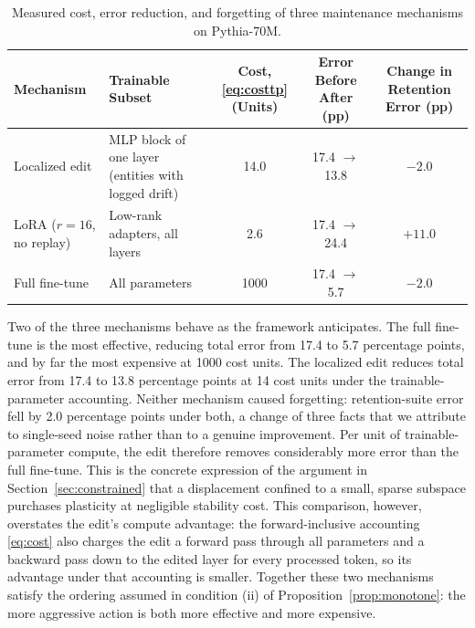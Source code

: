 \documentclass[electronics,article,submit,pdftex,moreauthors]{Definitions/mdpi}
\begin{document}
\begin{table}[H]
\caption{Measured cost, error reduction, and forgetting of three maintenance mechanisms on Pythia-70M.\label{tab:mechanisms}}
\small
\begin{tabularx}{\textwidth}{LLCCC}
\toprule
\textbf{Mechanism} & \textbf{Trainable Subset} & \textbf{Cost, \eqref{eq:costtp} (Units)} & \textbf{Error Before} \boldmath{$\to$} \textbf{After (pp)} & \textbf{Change in Retention Error (pp)}\\
\midrule
Localized edit & MLP block of one layer (entities with logged drift) & 14.0 & 17.4 $\to$ 13.8 & $-2.0$\\
LoRA ($r=16$, no replay) & Low-rank adapters, all layers & 2.6 & 17.4 $\to$ 24.4 & $+11.0$\\
Full fine-tune & All parameters & 1000 & 17.4 $\to$ 5.7 & $-2.0$\\
\bottomrule
\end{tabularx}
\end{table}

Two of the three mechanisms behave as the framework anticipates. The full fine-tune is the most effective, reducing total error from 17.4 to 5.7 percentage points, and by far the most expensive at 1000 cost units. The localized edit reduces total error from 17.4 to 13.8 percentage points at 14 cost units under the trainable-parameter accounting. Neither mechanism caused forgetting: retention-suite error fell by 2.0 percentage points under both, a change of three facts that we attribute to single-seed noise rather than to a genuine improvement. Per unit of trainable-parameter compute, the edit therefore removes considerably more error than the full fine-tune. This is the concrete expression of the argument in Section~\ref{sec:constrained} that a displacement confined to a small, sparse subspace purchases plasticity at negligible stability cost. This comparison, however, overstates the edit's compute advantage: the forward-inclusive accounting \eqref{eq:cost} also charges the edit a forward pass through all parameters and a backward pass down to the edited layer for every processed token, so its advantage under that accounting is smaller. Together these two mechanisms satisfy the ordering assumed in condition (ii) of Proposition~\ref{prop:monotone}: the more aggressive action is both more effective and more expensive.
\end{document}
